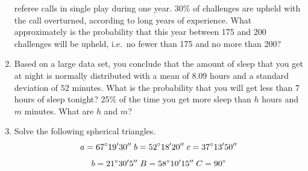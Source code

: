 \documentclass[11pt]{article}
\begin{document}
\begin{enumerate}
  referee calls in single play during one year. 30\% of challenges are
  upheld with the call overturned, according to long years of
  experience. What approximately is the probability that this year
  between 175 and 200 challenges will be upheld, i.e.\ no fewer than
  175 and no more than 200?
\item Based on a large data set, you conclude that the amount of sleep
   that you get at night is normally distributed with a mean of $8.09$ hours
   and a standard deviation of $52$ minutes. What is the probability
   that you will get less than 7 hours of sleep tonight? 25\% of the
   time you get more sleep than $h$ hours and $m$ minutes. What are
   $h$ and $m$?
 \item Solve the following spherical triangles.
   \begin{equation}
     \label{eq:isotufie}
     a=67^{\circ}19'30''\;{}b=52^{\circ}18'20''\;{}c=37^{\circ}13'50''\notag
   \end{equation}
   \begin{equation}
     \label{eq:eizokaih}
     b=21^{\circ}30'5''\;{}B=58^{\circ}10'15''\;{}C=90^{\circ}\notag
   \end{equation}
\end{enumerate}
\end{document}
